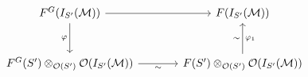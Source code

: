 \[\begin{tikzcd}[column sep=large,row sep=large]
F^G(I_{S'}(\mathcal M)) \arrow[r] & F(I_{S'}(\mathcal M))\\
F^G(S')\otimes_{\mathcal O(S')}\mathcal O(I_{S'}(\mathcal M)) \arrow[r,"\sim"'] & F(S')\otimes_{\mathcal O(S')}\mathcal O(I_{S'}(\mathcal M))
\arrow[u,"\sim" left,"\varphi_1" right]
\arrow[from=1-1,to=2-1,"\varphi"']
\end{tikzcd}\]
